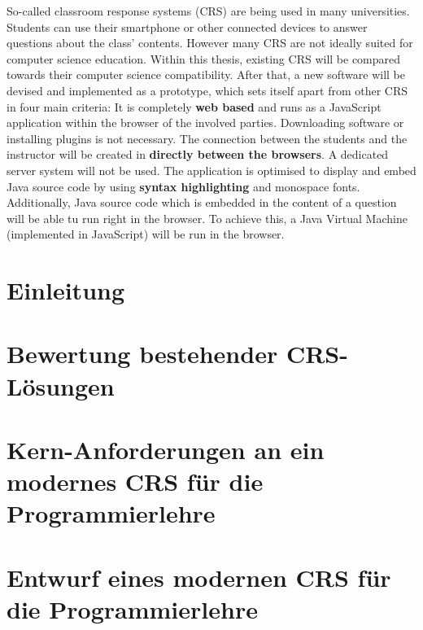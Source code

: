 \documentclass[draft=false
              ,paper=a4
              ,twoside=false
              ,fontsize=11pt
              ,headsepline
              ,BCOR=10mm
              ]{scrbook}
\begin{document}
{So-called classroom response systems (CRS) are being used in many universities. Students can use their smartphone or other connected devices to answer questions about the class' contents. However many CRS are not ideally suited for computer science education. Within this thesis, existing CRS will be compared towards their computer science compatibility. After that, a new software will be devised and implemented as a prototype, which sets itself apart from other CRS in four main criteria:\newline
It is completely \textbf{web based} and runs as a JavaScript application within the browser of the involved parties. Downloading software or installing plugins is not necessary.\newline
The connection between the students and the instructor will be created in \textbf{directly between the browsers}. A dedicated server system will not be used.\newline
The application is optimised to display and embed Java source code by using \textbf{syntax highlighting} and monospace fonts.\newline
Additionally, Java source code which is embedded in the content of a question will be able tu run right in the browser. To achieve this, a Java Virtual Machine (implemented in JavaScript) will be run in the browser.}
\newpage
\singlespacing

\setcounter{tocdepth}{3}
\tableofcontents
\newpage
\listoftables
\listoffigures
\lstlistoflistings


\mainmatter
\onehalfspacing

\chapter{Einleitung}

\label{chap:einleitung}
%
\chapter{Bewertung bestehender CRS-Lösungen}
\label{chap:bewertung}

%
\chapter{Kern-Anforderungen an ein modernes CRS für die Programmierlehre}
\label{chap:anforderungen}

%
\chapter{Entwurf eines modernen CRS für die Programmierlehre}
\label{chap:entwurf}

%
\end{document}
